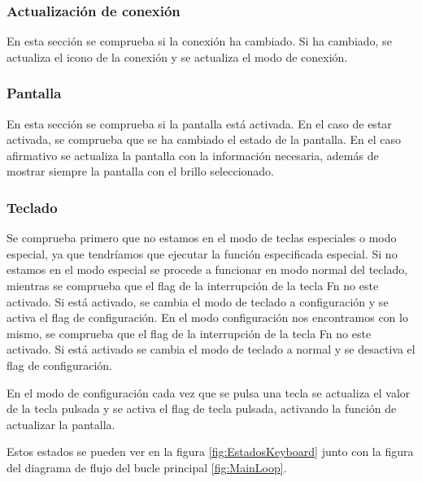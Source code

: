 \subsubsection{Actualización de conexión}
En esta sección se comprueba si la conexión ha cambiado. Si ha cambiado, se actualiza el icono de la conexión y se actualiza el modo de conexión.

\subsubsection{Pantalla}
En esta sección se comprueba si la pantalla está activada. En el caso de estar activada, se comprueba que se ha cambiado el estado de la pantalla. En el caso afirmativo se actualiza la pantalla con la información necesaria, además de mostrar siempre la pantalla con el brillo seleccionado.

\subsubsection{Teclado}
Se comprueba primero que no estamos en el modo de teclas especiales o modo especial, ya que tendríamos que ejecutar la función especificada especial.
Si no estamos en el modo especial se procede a funcionar en modo normal del teclado, mientras se comprueba que el flag de la interrupción de la tecla Fn no este activado. Si está activado, se cambia el modo de teclado a configuración y se activa el flag de configuración.
En el modo configuración nos encontramos con lo mismo, se comprueba que el flag de la interrupción de la tecla Fn no este activado. Si está activado se cambia el modo de teclado a normal y se desactiva el flag de configuración.

En el modo de configuración cada vez que se pulsa una tecla se actualiza el valor de la tecla pulsada y se activa el flag de tecla pulsada, activando la función de actualizar la pantalla.

Estos estados se pueden ver en la figura \ref{fig:EstadosKeyboard} junto con la figura del diagrama de flujo del bucle principal \ref{fig:MainLoop}.

